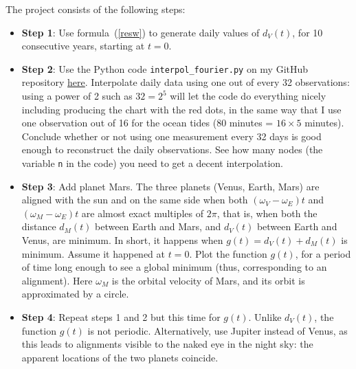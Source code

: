 \documentclass[oneside,10pt]{book}
\begin{document}
\noindent The project consists of the following steps: \vspace{1ex}
\begin{itemize}
\item[] {\bf Step 1}:  Use formula~(\ref{resw}) to generate daily values of $d_V(t)$, for 10 consecutive years, starting at $t=0$. \vspace{1ex}
\item[] {\bf Step 2}:  Use the Python code \texttt{interpol\_fourier.py} on my GitHub repository \href{https://github.com/VincentGranville/Statistical-Optimization/blob/main/interpol_fourier.py}{here}. Interpolate daily data using one out of every 32 observations: using a power of 2 such as $32=2^5$ will let the code do everything nicely including producing the chart with the red dots, in the same way that I use one observation out of 16 for the ocean tides (80 minutes = $16 \times 5$ minutes). Conclude whether or not using one measurement every 32 days is good enough to reconstruct the daily observations. See how many nodes (the variable \texttt{n} in the code) you need to get a decent interpolation. \vspace{1ex} 
\item[] {\bf Step 3}:  Add planet Mars. The three planets (Venus, Earth, Mars) are aligned with the sun and on the same side when both $(\omega_V-\omega_E)t$ and $(\omega_M-\omega_E)t$ are almost exact multiples of $2\pi$, that is, when both the distance $d_M(t)$ between Earth and Mars, and $d_V(t)$ between Earth and Venus, are minimum. In short, it happens when 
$g(t) = d_V(t) + d_M(t)$ is minimum.  Assume it happened at $t=0$. Plot the function $g(t)$, for a period of time long enough to see a global minimum (thus, corresponding to an alignment). Here $\omega_M$ is the orbital velocity of Mars, and its orbit is approximated by a circle. \vspace{1ex}
\item[] {\bf Step 4}: Repeat steps 1 and 2 but this time for $g(t)$. Unlike $d_V(t)$, the function $g(t)$ is not periodic. Alternatively, use Jupiter instead of Venus, as this leads to alignments visible to the naked eye in the night sky: the apparent locations of the two planets coincide. \vspace{1ex}


\end{itemize}
\end{document}
